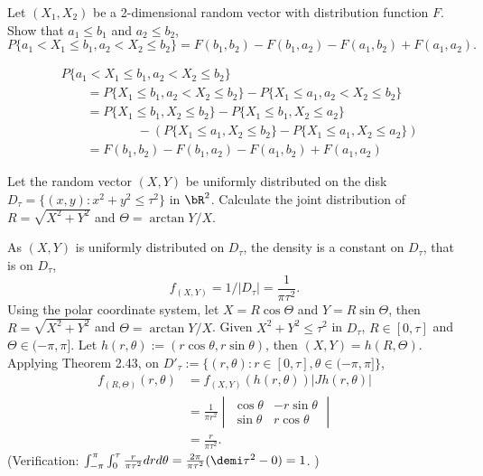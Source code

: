 \begin{exercise}
  Let $(X_1, X_2)$ be a 2-dimensional random vector with distribution function $F$. Show that $a_1\leq b_1$ and $a_2\leq b_2$,
  \[ P\{a_1<X_1\leq b_1, a_2<X_2\leq b_2\} = F(b_1,b_2) - F(b_1, a_2) - F(a_1,b_2) + F(a_1,a_2) .\]
\end{exercise}
\begin{solution}
  \begin{align*}
    & P\{a_1<X_1\leq b_1, a_2<X_2\leq b_2\} \\
      &\qquad= P\{X_1\leq b_1, a_2<X_2\leq b_2\} - P\{X_1\leq a_1, a_2<X_2\leq b_2\} \\
      &\qquad= P\{X_1\leq b_1, X_2\leq b_2\} - P\{X_1\leq b_1, X_2\leq a_2\} \\
      &\qquad\qquad\qquad - (P\{X_1\leq a_1, X_2\leq b_2\} - P\{X_1\leq a_1, X_2\leq a_2\}) \\
      &\qquad= F(b_1,b_2) - F(b_1, a_2) - F(a_1,b_2) + F(a_1,a_2)
  \end{align*}
\end{solution}


\begin{exercise}
  Let the random vector $(X, Y)$ be uniformly distributed on the disk $D_\tau=\{(x, y): x^2+y^2\leq \tau^2\}$ in $\bR^2$. Calculate the joint distribution of $R=\sqrt{X^2+Y^2}$ and $\Theta=\arctan Y/X$.
\end{exercise}
\begin{solution}
  As $(X, Y)$ is uniformly distributed on $D_\tau$, the density is a constant on $D_\tau$, that is on $D_\tau$,
  \[ f_{(X, Y)} = 1/|D_\tau| = \frac{1}{\pi \tau^2} .\]
  Using the polar coordinate system, let $X=R\cos\Theta$ and $Y=R\sin\Theta$, then $R = \sqrt{X^2+Y^2}$ and $\Theta=\arctan Y/X$. Given $X^2+Y^2\leq \tau^2$ in $D_\tau$, $R\in[0, \tau]$ and $\Theta\in(-\pi, \pi]$. Let $h(r, \theta) := (r\cos\theta, r\sin\theta)$, then $(X,Y) = h(R, \Theta)$. Applying Theorem 2.43, on $D'_\tau:=\{(r,\theta): r\in[0, \tau], \theta\in(-\pi, \pi]\}$,
  \begin{align*}
    f_{(R, \Theta)}(r,\theta) &= f_{(X, Y)}(h(r,\theta))|Jh(r, \theta)| \\
      &= \frac{1}{\pi r^2} \begin{vmatrix}\cos\theta & -r\sin\theta \\ \sin\theta & r\cos\theta \end{vmatrix} \\
      &= \frac{r}{\pi \tau^2}.
  \end{align*}
  (Verification: $\int_{-\pi}^\pi\int_0^\tau \frac{r}{\pi \tau^2} drd\theta = \frac{2\pi}{\pi \tau^2}(\demi \tau^2 - 0) = 1$. )
\end{solution}
